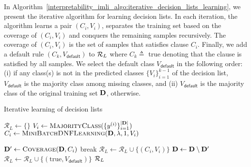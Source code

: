 In Algorithm~\ref{interpretability_imli_algo:iterative_decision_lists_learning}, we present the iterative algorithm for learning decision lists.  In each iteration, the algorithm learns a pair $ (C_i, V_i) $, separates the training set based on the coverage of $ (C_i, V_i) $ and conquers the remaining samples recursively. The coverage of $ (C_i, V_i) $ is the set of samples that satisfies clause $ C_i $. Finally, we add a default rule $ (C_k, V_\mathsf{default}) $ to $ {\mathcal{R}}_L $ where $ C_k \triangleq  $ true denoting that the clause is satisfied by all samples. We select the default class $ V_\mathsf{default} $ in the following order: (i) if any class(s) is not in the predicted classes $ \{V_i\}_{i=1}^{k-1} $ of the decision list, 
 $ V_{\mathsf{default}} $ is the majority class among missing classes, and (ii)  $ V_{\mathsf{default}} $ is the majority class of the original training set $ \mathbf{D} $, otherwise. 


\begin{algorithm}
	\caption{Iterative learning of decision lists}
	\label{interpretability_imli_algo:iterative_decision_lists_learning}
	\begin{algorithmic}[1]
		\State $ \mathcal{R}_L \leftarrow \{\}$
		\State $ V_i \leftarrow \textsc{MajorityClass}(\{y^{(i)}\}_{i=1}^{|\mathbf{D}|}) $ 
		\State $ C_i \leftarrow \textsc{MiniBatchDNFLearning}( \mathbf{D}, \lambda, 1, V_i) $ 
		
		\State $ \mathbf{D}' \leftarrow \textsc{Coverage}(\mathbf{D}, C_i) $
		\State break
		\EndIf
		\State $ \mathcal{R}_L \leftarrow \mathcal{R}_L \cup \{(C_i, V_i)\} $
		\State $ \mathbf{D}  \leftarrow \mathbf{D}  \setminus \mathbf{D}' $ 
		\EndFor
		\State $ \mathcal{R}_L \leftarrow \mathcal{R}_L  \cup \{(\text{true}, V_{\mathsf{default}} )\}$	
		\State \Return $ {\mathcal{R}}_L $
		\EndProcedure
	\end{algorithmic}
	
\end{algorithm}

